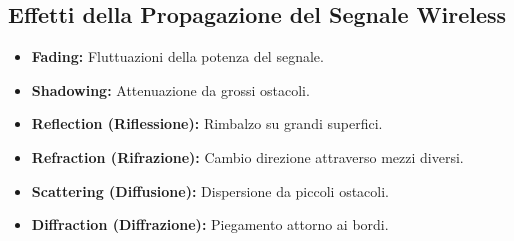 \subsection{Effetti della Propagazione del Segnale Wireless}
\begin{itemize}
    \item \textbf{Fading:} Fluttuazioni della potenza del segnale.
    \item \textbf{Shadowing:} Attenuazione da grossi ostacoli.
    \item \textbf{Reflection (Riflessione):} Rimbalzo su grandi superfici.
    \item \textbf{Refraction (Rifrazione):} Cambio direzione attraverso mezzi diversi.
    \item \textbf{Scattering (Diffusione):} Dispersione da piccoli ostacoli.
    \item \textbf{Diffraction (Diffrazione):} Piegamento attorno ai bordi.
\end{itemize}

